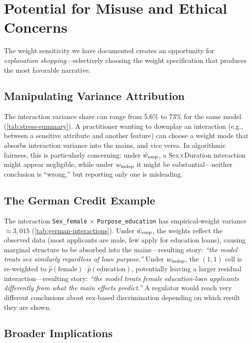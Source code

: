 \section{Potential for Misuse and Ethical Concerns}\label{sec:ethical}

The weight sensitivity we have documented creates an opportunity for \emph{explanation shopping}---selectively choosing the weight specification that produces the most favorable narrative.

\subsection{Manipulating Variance Attribution}

The interaction variance share can range from 5.6\% to 73\% for the same model (\cref{tab:stress-summary}).
A practitioner wanting to downplay an interaction (e.g., between a sensitive attribute and another feature) can choose a weight mode that absorbs interaction variance into the mains, and vice versa.
In algorithmic fairness, this is particularly concerning: under $\hat{w}_{\mathrm{emp}}$, a Sex$\times$Duration interaction might appear negligible, while under $w_{\mathrm{indep}}$ it might be substantial---neither conclusion is ``wrong,'' but reporting only one is misleading.

\subsection{The German Credit Example}

The interaction \texttt{Sex\_female} $\times$ \texttt{Purpose\_education} has empirical-weight variance $\approx 3{,}015$ (\cref{tab:german-interactions}).
Under $\hat{w}_{\mathrm{emp}}$, the weights reflect the observed data (most applicants are male, few apply for education loans), causing marginal structure to be absorbed into the mains---resulting story: \emph{``the model treats sex similarly regardless of loan purpose.''}
Under $w_{\mathrm{indep}}$, the $(1,1)$ cell is re-weighted to $\hat{p}(\text{female}) \cdot \hat{p}(\text{education})$, potentially leaving a larger residual interaction---resulting story: \emph{``the model treats female education-loan applicants differently from what the main effects predict.''}
A regulator would reach very different conclusions about sex-based discrimination depending on which result they are shown.

\subsection{Broader Implications}

